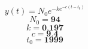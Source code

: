 \documentclass[border=0pt,varwidth,fleqn]{standalone}
\begin{document}
 
\huge
\[
    y(t) = N_0 e^{-k e^{-c (t - t_0)}}
\]
\large
\[
    N_0 = \textbf{94}
\]
\[
    k = \textbf{0.197}
\]
\[
    c = \textbf{9.4}
\]
\[
    t_0 = \textbf{1999}
\]
\end{document}
